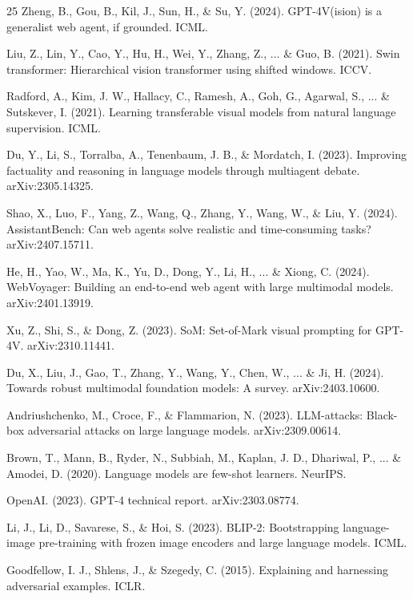 \documentclass{llncs}
\begin{document}
\begin{thebibliography}{25}
Zheng, B., Gou, B., Kil, J., Sun, H., \& Su, Y. (2024). GPT-4V(ision) is a generalist web agent, if grounded. ICML.

Liu, Z., Lin, Y., Cao, Y., Hu, H., Wei, Y., Zhang, Z., ... \& Guo, B. (2021). Swin transformer: Hierarchical vision transformer using shifted windows. ICCV.

Radford, A., Kim, J. W., Hallacy, C., Ramesh, A., Goh, G., Agarwal, S., ... \& Sutskever, I. (2021). Learning transferable visual models from natural language supervision. ICML.

Du, Y., Li, S., Torralba, A., Tenenbaum, J. B., \& Mordatch, I. (2023). Improving factuality and reasoning in language models through multiagent debate. arXiv:2305.14325.

Shao, X., Luo, F., Yang, Z., Wang, Q., Zhang, Y., Wang, W., \& Liu, Y. (2024). AssistantBench: Can web agents solve realistic and time-consuming tasks? arXiv:2407.15711.

He, H., Yao, W., Ma, K., Yu, D., Dong, Y., Li, H., ... \& Xiong, C. (2024). WebVoyager: Building an end-to-end web agent with large multimodal models. arXiv:2401.13919.

Xu, Z., Shi, S., \& Dong, Z. (2023). SoM: Set-of-Mark visual prompting for GPT-4V. arXiv:2310.11441.

Du, X., Liu, J., Gao, T., Zhang, Y., Wang, Y., Chen, W., ... \& Ji, H. (2024). Towards robust multimodal foundation models: A survey. arXiv:2403.10600.

Andriushchenko, M., Croce, F., \& Flammarion, N. (2023). LLM-attacks: Black-box adversarial attacks on large language models. arXiv:2309.00614.

Brown, T., Mann, B., Ryder, N., Subbiah, M., Kaplan, J. D., Dhariwal, P., ... \& Amodei, D. (2020). Language models are few-shot learners. NeurIPS.

OpenAI. (2023). GPT-4 technical report. arXiv:2303.08774.

Li, J., Li, D., Savarese, S., \& Hoi, S. (2023). BLIP-2: Bootstrapping language-image pre-training with frozen image encoders and large language models. ICML.

Goodfellow, I. J., Shlens, J., \& Szegedy, C. (2015). Explaining and harnessing adversarial examples. ICLR.

\end{thebibliography}
\end{document}
